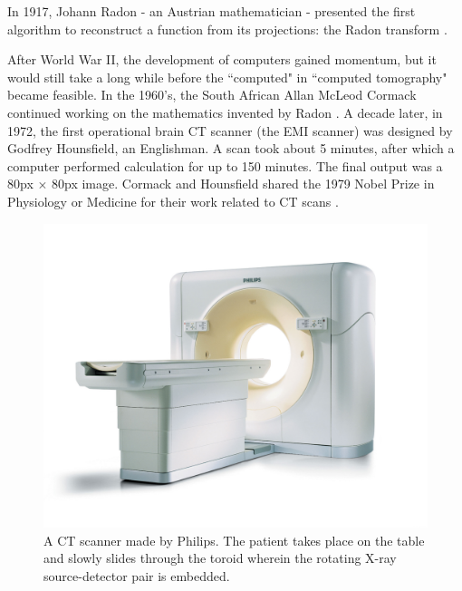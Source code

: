 In 1917, Johann Radon - an Austrian mathematician - presented the first
algorithm to reconstruct a function from its projections: the Radon transform
\cite{radon}.

After World War II, the development of computers gained momentum, but it would
still take a long while before the ``computed" in ``computed tomography" became
feasible. In the 1960's, the South African Allan McLeod Cormack continued
working on the mathematics invented by Radon \cite{ctreview}. A decade later, in
1972, the first operational brain CT scanner (the EMI scanner) was designed by
Godfrey Hounsfield, an Englishman. A scan took about 5 minutes, after which a
computer performed calculation for up to 150 minutes. The final output was a
80px $\times$ 80px image. Cormack and Hounsfield shared the 1979 Nobel Prize in
Physiology or Medicine for their work related to CT scans \cite{ctbook}.

\begin{figure}[ht]
\begin{center}
  \includegraphics[width=\linewidth]{img/ctscanner.jpg}
  \caption{A CT scanner made by Philips. The patient takes place on the table
  and slowly slides through the toroid wherein the rotating X-ray
  source-detector pair is embedded.}
  \label{fig:ctscanner}
\end{center}
\end{figure}

